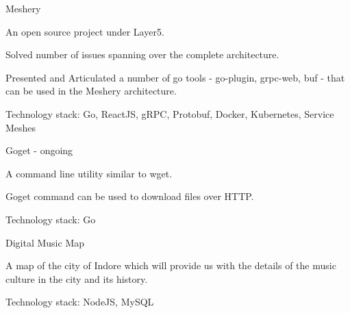 
\begin{cventries}

  \cventry
    {} %
    {Meshery} %
    {} %
    {} %
    {
      \begin{cvitems} %
        \item {An open source project under Layer5.}
        \item {Solved number of issues spanning over the complete architecture.}
        \item {Presented and Articulated a number of go tools - go-plugin, grpc-web, buf -  that can be used in the Meshery architecture.}
        \item {Technology stack: Go, ReactJS, gRPC, Protobuf, Docker, Kubernetes, Service Meshes}
      \end{cvitems}
    }


  \cventry
    {} %
    {Goget - ongoing} %
    {} %
    {} %
    {
      \begin{cvitems} %
        \item {A command line utility similar to wget.}
        \item {Goget command can be used to download files over HTTP.}
        \item {Technology stack: Go}
      \end{cvitems}
    }


  \cventry
    {} %
    {Digital Music Map} %
    {} %
    {} %
    {
      \begin{cvitems} %
        \item {A map of the city of Indore which will provide us with the details of the music culture in the city and its history.}
        \item {Technology stack: NodeJS, MySQL}
      \end{cvitems}
    }


\end{cventries}
